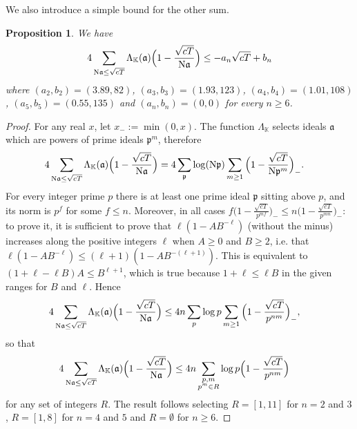 \documentclass[a4paper,11pt]{amsart}
\newcommand{\field}[1]{\mathbb{{#1}}}
\newcommand{\ideal}[1]{\mathfrak{{#1}}}
\newcommand{\K}{\field{{K}}}
\newcommand{\p}{\ideal{p}}
\renewcommand{\a}{\ideal{a}}
\newcommand{\Norm}{\textrm{\upshape N}}
\newtheorem{proposition}{Proposition}
\theoremstyle{remark}
\begin{document}
%
We also introduce a simple bound for the other sum.
\begin{proposition}\label{prop:2A}
We have
\[
 4\sum_{\Norm\a\leq \sqrt{cT}} \Lambda_{\K}(\a)\Big(1 - \frac{\sqrt{cT}}{\Norm\a}\Big)
 \leq -a_n \sqrt{cT} + b_n
\]
where $(a_2,b_2) = (3.89,82)$, $(a_3,b_3) = (1.93,123)$, $(a_4,b_4) = (1.01,108)$, $(a_5,b_5) = (0.55,135)$
and $(a_n,b_n) = (0,0)$ for every $n\geq 6$.
\end{proposition}
\begin{proof}
For any real $x$, let $x_-:=\min(0,x)$. %
The function $\Lambda_{\K}$ selects ideals $\a$ which are powers of prime ideals $\p^m$, therefore
%
\begin{align*}
4\sum_{\Norm\a\leq \sqrt{cT}} \Lambda_{\K}(\a)\Big(1 - \frac{\sqrt{cT}}{\Norm\a}\Big)
&  =  4\sum_{\p} \log(\Norm\p)\sum_{m\geq 1}\Big(1 - \frac{\sqrt{cT}}{\Norm\p^m}\Big)_-.
%
\end{align*}
For every integer prime $p$ there is at least one prime ideal $\p$ sitting above $p$, and its norm is
$p^f$ for some $f\leq n$. Moreover, in all cases $f\big(1 - \frac{\sqrt{cT}}{p^{m f}}\big)_- \leq n\big(1
- \frac{\sqrt{cT}}{p^{m n}}\big)_-$:
%
to prove it, it is sufficient to prove that $\ell(1 - A B^{-\ell})$ (without the minus) increases along
the positive integers $\ell$ when $A\geq 0$ and $B\geq 2$, i.e. that $\ell(1-A B^{-\ell}) \leq
(\ell+1)(1-A B^{-(\ell+1)})$. This is equivalent to $(1 + \ell - \ell B) A \leq B^{\ell+1}$, which is
true because $1 + \ell \leq \ell B$ in the given ranges for $B$ and $\ell$. Hence
%
\begin{align*}
4\sum_{\Norm\a\leq \sqrt{cT}} \Lambda_{\K}(\a)\Big(1 - \frac{\sqrt{cT}}{\Norm\a}\Big)
&\leq 4 n\sum_p \log p\sum_{m\geq 1}\Big(1 - \frac{\sqrt{cT}}{p^{n m}}\Big)_-,
\end{align*}
%
so that
%
\begin{align*}
4\sum_{\Norm\a\leq \sqrt{cT}} \Lambda_{\K}(\a)\Big(1 - \frac{\sqrt{cT}}{\Norm\a}\Big)
&\leq 4 n\sum_{\substack{p,m\\p^m\in R}}\log p \Big(1 - \frac{\sqrt{cT}}{p^{n m}}\Big)
\end{align*}
%
for any set of integers $R$. The result follows selecting $R=[1,11]$ for $n=2$ and $3$, $R=[1,8]$ for
$n=4$ and $5$ and $R=\emptyset$ for $n\geq 6$.
%
\end{proof}
\end{document}
